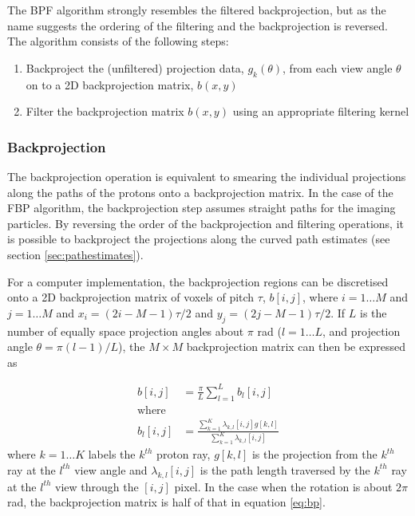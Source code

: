 \documentclass[11pt,a4paper]{article}
\begin{document}
The BPF algorithm strongly resembles the filtered backprojection, but as the name suggests the ordering of the filtering and the backprojection is reversed. The algorithm consists of the following steps:
\begin{enumerate}
\item Backproject the (unfiltered) projection data, $g_k(\theta)$, from each view angle $\theta$ on to a 2D backprojection matrix, $b(x,y)$
\item Filter the backprojection matrix $b(x,y)$ using an appropriate filtering kernel
\end{enumerate}

\subsubsection{Backprojection}
The backprojection operation is equivalent to smearing the individual projections along the paths of the protons onto a backprojection matrix. In the case of the FBP algorithm, the backprojection step assumes straight paths for the imaging particles. By reversing the order of the backprojection and filtering operations, it is possible to backproject the projections along the curved path estimates (see section \ref{sec:pathestimates}).

For a computer implementation, the backprojection regions can be discretised onto a 2D backprojection matrix of voxels of pitch $\tau$, $b[i,j]$, where $i = 1 \dots M$ and $j = 1 \dots M$ and $x_{i} = (2i - M - 1)\tau/2$ and $y_j = (2j - M - 1)\tau/2$. If $L$ is the number of equally space projection angles about $\pi$ rad ($ l = 1 \dots L$, and projection angle $\theta = \pi (l - 1)/L$), the $M \times M$ backprojection matrix can then be expressed as

\begin{align}
\label{eq:bp}
b[i,j] & = \frac{\pi}{L}\sum_{l=1}^L b_l[i,j] \\
\text{where} \nonumber\\
b_l[i,j] & = \frac{\sum_{k=1}^K \lambda_{k,l}[i,j] g[k,l]}{\sum_{k=1}^{K} \lambda_{k,l}[i,j]} \label{eq:angularbpf}
\end{align}
where $k=1 \dots K$ labels the $k^{th}$ proton ray, $g[k,l]$ is the projection from the $k^{th}$ ray at the $l^{th}$ view angle and $\lambda_{k,l}[i,j]$ is the path length traversed by the $k^{th}$ ray at the $l^{th}$ view through the $[i,j]$ pixel. In the case when the rotation is about $2\pi$ rad, the backprojection matrix is half of that in equation \ref{eq:bp}.
\end{document}
